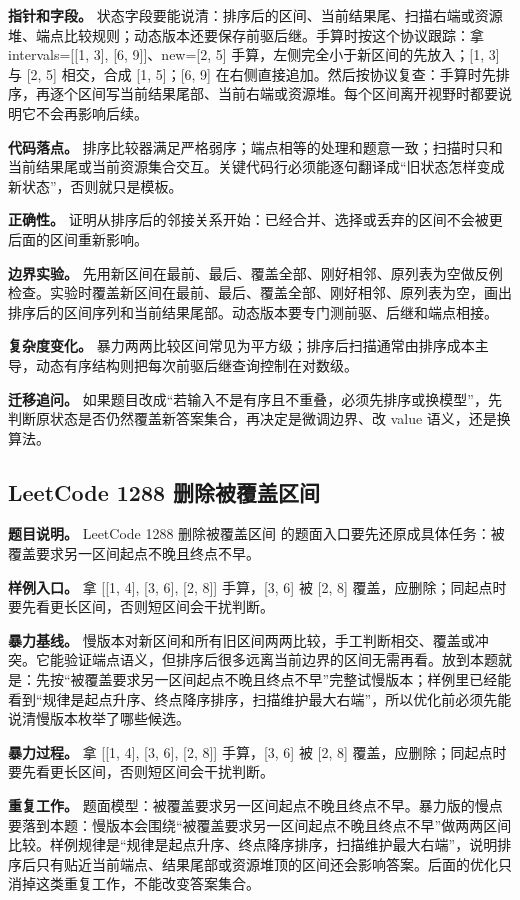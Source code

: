 \textbf{指针和字段。} 状态字段要能说清：排序后的区间、当前结果尾、扫描右端或资源堆、端点比较规则；动态版本还要保存前驱后继。手算时按这个协议跟踪：拿 intervals=[[1, 3], [6, 9]]、new=[2, 5] 手算，左侧完全小于新区间的先放入；[1, 3] 与 [2, 5] 相交，合成 [1, 5]；[6, 9] 在右侧直接追加。然后按协议复查：手算时先排序，再逐个区间写当前结果尾部、当前右端或资源堆。每个区间离开视野时都要说明它不会再影响后续。

\textbf{代码落点。} 排序比较器满足严格弱序；端点相等的处理和题意一致；扫描时只和当前结果尾或当前资源集合交互。关键代码行必须能逐句翻译成“旧状态怎样变成新状态”，否则就只是模板。

\textbf{正确性。} 证明从排序后的邻接关系开始：已经合并、选择或丢弃的区间不会被更后面的区间重新影响。

\textbf{边界实验。} 先用新区间在最前、最后、覆盖全部、刚好相邻、原列表为空做反例检查。实验时覆盖新区间在最前、最后、覆盖全部、刚好相邻、原列表为空，画出排序后的区间序列和当前结果尾部。动态版本要专门测前驱、后继和端点相接。

\textbf{复杂度变化。} 暴力两两比较区间常见为平方级；排序后扫描通常由排序成本主导，动态有序结构则把每次前驱后继查询控制在对数级。

\textbf{迁移追问。} 如果题目改成“若输入不是有序且不重叠，必须先排序或换模型”，先判断原状态是否仍然覆盖新答案集合，再决定是微调边界、改 value 语义，还是换算法。

\subsection{LeetCode 1288 删除被覆盖区间}

\textbf{题目说明。} LeetCode 1288 删除被覆盖区间 的题面入口要先还原成具体任务：被覆盖要求另一区间起点不晚且终点不早。

\textbf{样例入口。} 拿 [[1, 4], [3, 6], [2, 8]] 手算，[3, 6] 被 [2, 8] 覆盖，应删除；同起点时要先看更长区间，否则短区间会干扰判断。

\textbf{暴力基线。} 慢版本对新区间和所有旧区间两两比较，手工判断相交、覆盖或冲突。它能验证端点语义，但排序后很多远离当前边界的区间无需再看。放到本题就是：先按“被覆盖要求另一区间起点不晚且终点不早”完整试慢版本；样例里已经能看到“规律是起点升序、终点降序排序，扫描维护最大右端”，所以优化前必须先能说清慢版本枚举了哪些候选。

\textbf{暴力过程。} 拿 [[1, 4], [3, 6], [2, 8]] 手算，[3, 6] 被 [2, 8] 覆盖，应删除；同起点时要先看更长区间，否则短区间会干扰判断。

\textbf{重复工作。} 题面模型：被覆盖要求另一区间起点不晚且终点不早。暴力版的慢点要落到本题：慢版本会围绕“被覆盖要求另一区间起点不晚且终点不早”做两两区间比较。样例规律是“规律是起点升序、终点降序排序，扫描维护最大右端”，说明排序后只有贴近当前端点、结果尾部或资源堆顶的区间还会影响答案。后面的优化只消掉这类重复工作，不能改变答案集合。

